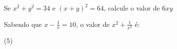 \documentclass[10pt,a4paper]{article}
\begin{document}
\begin{multicols}{2}
    \begin{question}[type=exam]
        Se $x^2 + y^2 = 34$ e $(x + y)^2 = 64$, calcule o valor de $6xy$
    \end{question}

    \begin{question}[type=exam]
        Sabendo que $x - \frac{1}{x} = 10$, o valor de $x^2 + \frac{1}{x^2}$ é:

        \begin{tasks}(5)
        \end{tasks}
    \end{question}


		\clearpage
	\end{multicols}

\end{document}
